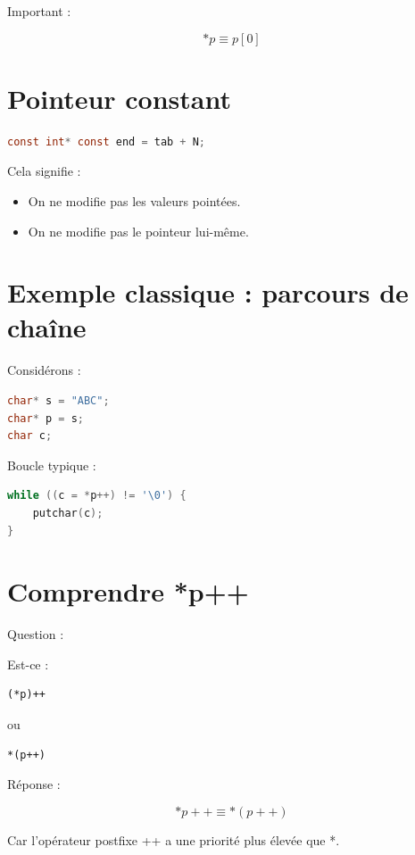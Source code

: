 Important :

\[
\boxed{
* p \equiv p[0]
}
\]

\section{Pointeur constant}

\begin{lstlisting}[language=C]
const int* const end = tab + N;
\end{lstlisting}

Cela signifie :

\begin{itemize}
\item On ne modifie pas les valeurs pointées.
\item On ne modifie pas le pointeur lui-même.
\end{itemize}

\section{Exemple classique : parcours de chaîne}

Considérons :

\begin{lstlisting}[language=C]
char* s = "ABC";
char* p = s;
char c;
\end{lstlisting}

Boucle typique :

\begin{lstlisting}[language=C]
while ((c = *p++) != '\0') {
    putchar(c);
}
\end{lstlisting}

\section{Comprendre *p++}

Question :

Est-ce :

\begin{lstlisting}
(*p)++
\end{lstlisting}

ou

\begin{lstlisting}
*(p++)
\end{lstlisting}

Réponse :

\[
\boxed{
*p++ \equiv *(p++)
}
\]

Car l’opérateur postfixe ++ a une priorité plus élevée que *.

